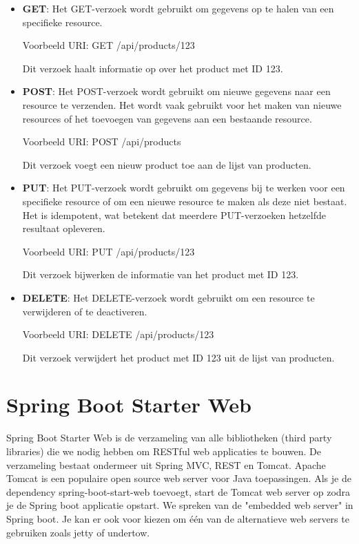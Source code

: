 \begin{itemize}
\item \textbf{GET}: Het GET-verzoek wordt gebruikt om gegevens op te halen van een specifieke resource. 

Voorbeeld URI: GET /api/products/123

Dit verzoek haalt informatie op over het product met ID 123.

\item \textbf{POST}: Het POST-verzoek wordt gebruikt om nieuwe gegevens naar een resource te verzenden. Het wordt vaak gebruikt voor het maken van nieuwe resources of het toevoegen van gegevens aan een bestaande resource.

Voorbeeld URI: POST /api/products

Dit verzoek voegt een nieuw product toe aan de lijst van producten.

\item \textbf{PUT}: Het PUT-verzoek wordt gebruikt om gegevens bij te werken voor een specifieke resource of om een nieuwe resource te maken als deze niet bestaat. Het is idempotent, wat betekent dat meerdere PUT-verzoeken hetzelfde resultaat opleveren.

Voorbeeld URI: PUT /api/products/123

Dit verzoek bijwerken de informatie van het product met ID 123.

\item \textbf{DELETE}: Het DELETE-verzoek wordt gebruikt om een resource te verwijderen of te deactiveren.

Voorbeeld URI: DELETE /api/products/123

Dit verzoek verwijdert het product met ID 123 uit de lijst van producten.
\end{itemize}

\section{Spring Boot Starter Web}

Spring Boot Starter Web is de verzameling van alle bibliotheken (third party libraries) die we nodig hebben om RESTful web applicaties te bouwen.  De verzameling bestaat ondermeer uit Spring MVC,  REST en Tomcat. 
Apache Tomcat is een populaire open source web server voor Java toepassingen.  Als je de dependency spring-boot-start-web toevoegt, start de Tomcat web server op zodra je de Spring boot applicatie opstart.  We spreken van de "embedded web server" in Spring boot.  Je kan er ook voor kiezen om  \'e\'en van de alternatieve web servers te gebruiken zoals jetty of undertow.

